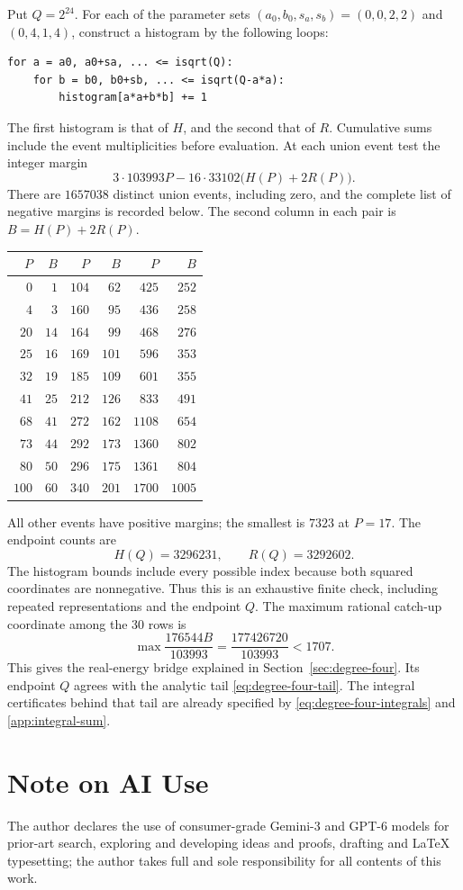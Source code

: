 \documentclass[11pt,reqno]{amsart}
\numberwithin{equation}{section}
\begin{document}
Put $Q=2^{24}$. For each of the parameter sets
$(a_0,b_0,s_a,s_b)=(0,0,2,2)$ and $(0,4,1,4)$, construct a histogram
by the following loops:
\begin{verbatim}
for a = a0, a0+sa, ... <= isqrt(Q):
    for b = b0, b0+sb, ... <= isqrt(Q-a*a):
        histogram[a*a+b*b] += 1
\end{verbatim}
The first histogram is that of $H$, and the second that of $R$.
Cumulative sums include the event multiplicities before evaluation.
At each union event test the integer margin
\[
 3\cdot103993P-16\cdot33102\bigl(H(P)+2R(P)\bigr).
\]
There are $1657038$ distinct union events, including zero, and the
complete list of negative margins is recorded below. The second
column in each pair is $B=H(P)+2R(P)$.
\begin{center}
\begin{tabular}{r|r@{\qquad}r|r@{\qquad}r|r}
$P$&$B$&$P$&$B$&$P$&$B$\\ \hline
$0$&$1$&$104$&$62$&$425$&$252$\\
$4$&$3$&$160$&$95$&$436$&$258$\\
$20$&$14$&$164$&$99$&$468$&$276$\\
$25$&$16$&$169$&$101$&$596$&$353$\\
$32$&$19$&$185$&$109$&$601$&$355$\\
$41$&$25$&$212$&$126$&$833$&$491$\\
$68$&$41$&$272$&$162$&$1108$&$654$\\
$73$&$44$&$292$&$173$&$1360$&$802$\\
$80$&$50$&$296$&$175$&$1361$&$804$\\
$100$&$60$&$340$&$201$&$1700$&$1005$
\end{tabular}
\end{center}
All other events have positive margins; the smallest is $7323$ at
$P=17$. The endpoint counts are
\[
 H(Q)=3296231,\qquad R(Q)=3292602.
\]
The histogram bounds include every possible index because both
squared coordinates are nonnegative. Thus this is an exhaustive
finite check, including repeated representations and the endpoint
$Q$. The maximum rational catch-up coordinate among the 30 rows is
\[
 \max\frac{176544B}{103993}
 =\frac{177426720}{103993}<1707.
\]
This gives the real-energy bridge explained in
Section~\ref{sec:degree-four}. Its endpoint $Q$ agrees with the
analytic tail \eqref{eq:degree-four-tail}. The integral certificates
behind that tail are already specified by
\eqref{eq:degree-four-integrals} and \eqref{app:integral-sum}.

\section*{Note on AI Use}
The author declares the use of consumer-grade Gemini-3 and GPT-6 models for prior-art search, exploring and developing ideas and proofs, drafting and LaTeX typesetting; the author takes full and sole responsibility for all contents of this work.
\end{document}
